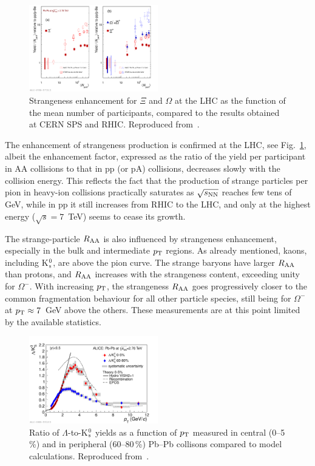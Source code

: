 \begin{figure}
\centering
\includegraphics[width=0.5\textwidth]{ksfigures/StrangenessEnhancemet.pdf}
\caption{Strangeness enhancement for $\Xi$ and $\Omega$ at the LHC as the function of the mean number of participants, compared to the results obtained at CERN SPS and RHIC. Reproduced from~\cite{ABELEV:2013zaa}.}
\label{figks:StrageEnhancement}
\end{figure}


The enhancement of strangeness production is confirmed at the LHC, see Fig.~\ref{figks:StrageEnhancement}, albeit the enhancement factor, expressed as the ratio of the yield per participant in AA collisions to that in pp (or pA) collisions, decreases slowly with the collision energy. This reflects the fact that the production of strange particles per pion in heavy-ion collisions practically saturates as $\sqrt{s_{\rm NN}}$ reaches few tens of GeV, while in pp it still increases from RHIC to the LHC, and only at the highest energy ($\sqrt{s} = 7$~TeV) seems to cease its growth.

The strange-particle $R_{\rm AA}$ is also influenced by strangeness enhancement, especially in the bulk and intermediate $p_{\rm T}$ regions. As already mentioned, kaons, including K$_{\rm s}^0$, are above the pion curve. The strange baryons have larger $R_{\rm AA}$ than protons, and $R_{\rm AA}$ increases with the strangeness content, exceeding unity for $\Omega^-$. With increasing $p_{\rm T}$, the strangeness $R_{\rm AA}$ goes progressively closer to the common fragmentation behaviour for all other particle species, still being for $\Omega^-$ at $p_{\rm T} \approx 7$~GeV above the others. These measurements are at this point limited by the available statistics.

\begin{figure}
\centering
\includegraphics[width=0.5\textwidth]{ksfigures/LambdaToK0T.pdf}
\caption{Ratio of $\Lambda$-to-K$_{\rm s}^0$ yields as a function of $p_{\rm T}$ measured in central (0--5\,\%) and in peripheral (60--80\,\%) Pb--Pb collisons compared to model calculations. Reproduced from~\cite{Abelev:2013xaa}.}
\label{figks:LambdaToK}
\end{figure}


